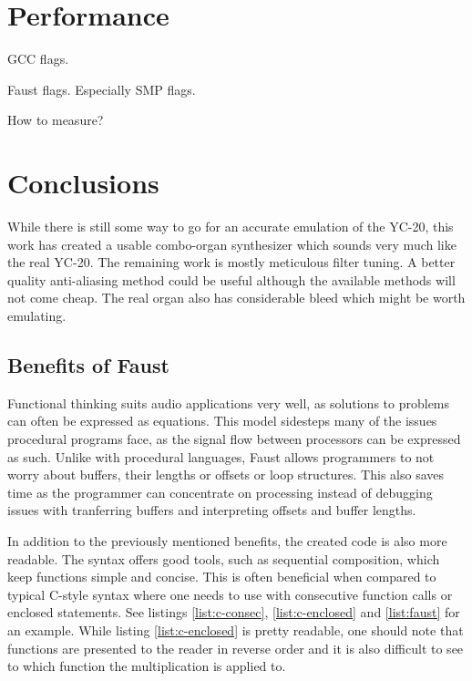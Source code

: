 \documentclass[11pt,a4paper]{article}
\begin{document}

\section{Performance}

GCC flags.

Faust flags. Especially SMP flags.

How to measure?

\section{Conclusions}

While there is still some way to go for an accurate emulation of the YC-20, this work has created a usable combo-organ synthesizer which sounds very much like the real YC-20.  The remaining work is mostly meticulous filter tuning. A better quality anti-aliasing method could be useful although the available methods will not come cheap. The real organ also has considerable bleed which might be worth emulating.

\subsection{Benefits of Faust}

Functional thinking suits audio applications very well, as solutions to problems can often be expressed as equations. This model sidesteps many of the issues procedural programs face, as the signal flow between processors can be expressed as such. Unlike with procedural languages, Faust allows programmers to not worry about buffers, their lengths or offsets or loop structures. This also saves time as the programmer can concentrate on processing instead of debugging issues with tranferring buffers and interpreting offsets and buffer lengths.

In addition to the previously mentioned benefits, the created code is also more readable. The syntax offers good tools, such as sequential composition, which keep functions simple and concise. This is often beneficial when compared to typical C-style syntax where one needs to use with consecutive function calls or enclosed statements. See listings \ref{list:c-consec}, \ref{list:c-enclosed} and \ref{list:faust} for an example. While listing \ref{list:c-enclosed} is pretty readable, one should note that functions are presented to the reader in reverse order and it is also difficult to see to which function the multiplication is applied to.
\end{document}
